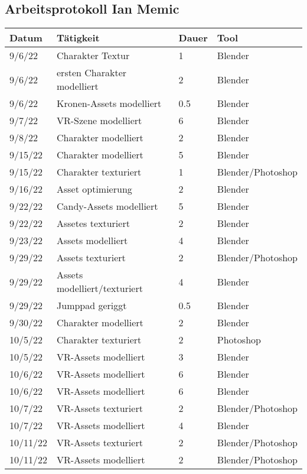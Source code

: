 \subsection{Arbeitsprotokoll Ian Memic}
\begin{longtable}{|p{1.5cm}|p{5.5cm}|p{1.2cm}|p{3.2cm}|}
	\hline
	\textbf{Datum} & \textbf{Tätigkeit} & \textbf{Dauer} & \textbf{Tool} \\ \hline
	\endhead
	9/6/22 & Charakter Textur & 1 & Blender \\ \hline
	9/6/22 & ersten Charakter modelliert & 2 & Blender \\ \hline
	9/6/22 & Kronen-Assets modelliert & 0.5 & Blender \\ \hline
	9/7/22 & VR-Szene modelliert & 6 & Blender \\ \hline
	9/8/22 & Charakter modelliert & 2 & Blender \\ \hline
	9/15/22 & Charakter modelliert & 5 & Blender \\ \hline
	9/15/22 & Charakter texturiert & 1 & Blender/Photoshop \\ \hline
	9/16/22 & Asset optimierung & 2 & Blender \\ \hline
	9/22/22 & Candy-Assets modelliert & 5 & Blender \\ \hline
	9/22/22 & Assetes texturiert & 2 & Blender \\ \hline
	9/23/22 & Assets modelliert & 4 & Blender \\ \hline
	9/29/22 & Assets texturiert & 2 & Blender/Photoshop \\ \hline
	9/29/22 & Assets modelliert/texturiert & 4 & Blender \\ \hline
	9/29/22 & Jumppad geriggt & 0.5 & Blender \\ \hline
	9/30/22 & Charakter modelliert & 2 & Blender \\ \hline
	10/5/22 & Charakter texturiert & 2 & Photoshop \\ \hline
	10/5/22 & VR-Assets modelliert & 3 & Blender \\ \hline
	10/6/22 & VR-Assets modelliert & 6 & Blender \\ \hline
	10/6/22 & VR-Assets modelliert & 6 & Blender \\ \hline
	10/7/22 & VR-Assets texturiert & 2 & Blender/Photoshop \\ \hline
	10/7/22 & VR-Assets modelliert & 4 & Blender \\ \hline
	10/11/22 & VR-Assets texturiert & 2 & Blender/Photoshop \\ \hline
	10/11/22 & VR-Assets modelliert & 2 & Blender/Photoshop \\ \hline

\end{longtable}
